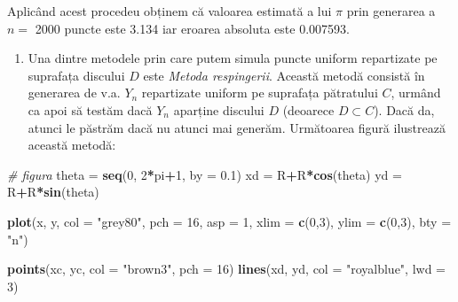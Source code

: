\documentclass[]{article}
\newenvironment{Shaded}{\begin{snugshade}}{\end{snugshade}}
\newcommand{\KeywordTok}[1]{\textcolor[rgb]{0.13,0.29,0.53}{\textbf{#1}}}
\newcommand{\DataTypeTok}[1]{\textcolor[rgb]{0.13,0.29,0.53}{#1}}
\newcommand{\DecValTok}[1]{\textcolor[rgb]{0.00,0.00,0.81}{#1}}
\newcommand{\FloatTok}[1]{\textcolor[rgb]{0.00,0.00,0.81}{#1}}
\newcommand{\StringTok}[1]{\textcolor[rgb]{0.31,0.60,0.02}{#1}}
\newcommand{\CommentTok}[1]{\textcolor[rgb]{0.56,0.35,0.01}{\textit{#1}}}
\newcommand{\OperatorTok}[1]{\textcolor[rgb]{0.81,0.36,0.00}{\textbf{#1}}}
\newcommand{\NormalTok}[1]{#1}
\providecommand{\tightlist}{%
  \setlength{\itemsep}{0pt}\setlength{\parskip}{0pt}}
\begin{document}
Aplicând acest procedeu obținem că valoarea estimată a lui \(\pi\) prin
generarea a \(n=\) 2000 puncte este 3.134 iar eroarea absoluta este
0.007593.

\begin{enumerate}
\def\labelenumi{\arabic{enumi}.}
\setcounter{enumi}{1}
\tightlist
\item
  Una dintre metodele prin care putem simula puncte uniform repartizate
  pe suprafața discului \(D\) este \emph{Metoda respingerii}. Această
  metodă consistă în generarea de v.a. \(Y_n\) repartizate uniform pe
  suprafața pătratului \(C\), urmând ca apoi să testăm dacă \(Y_n\)
  aparține discului \(D\) (deoarece \(D\subset C\)). Dacă da, atunci le
  păstrăm dacă nu atunci mai generăm. Următoarea figură ilustrează
  această metodă:
\end{enumerate}

\begin{Shaded}
\begin{Highlighting}[]
\CommentTok{# figura }
\NormalTok{theta =}\StringTok{ }\KeywordTok{seq}\NormalTok{(}\DecValTok{0}\NormalTok{, }\DecValTok{2}\OperatorTok{*}\NormalTok{pi}\OperatorTok{+}\DecValTok{1}\NormalTok{, }\DataTypeTok{by =} \FloatTok{0.1}\NormalTok{)}
\NormalTok{xd =}\StringTok{ }\NormalTok{R}\OperatorTok{+}\NormalTok{R}\OperatorTok{*}\KeywordTok{cos}\NormalTok{(theta)}
\NormalTok{yd =}\StringTok{ }\NormalTok{R}\OperatorTok{+}\NormalTok{R}\OperatorTok{*}\KeywordTok{sin}\NormalTok{(theta)}

\KeywordTok{plot}\NormalTok{(x, y, }
     \DataTypeTok{col =} \StringTok{"grey80"}\NormalTok{, }\DataTypeTok{pch =} \DecValTok{16}\NormalTok{,}
     \DataTypeTok{asp =} \DecValTok{1}\NormalTok{, }
     \DataTypeTok{xlim =} \KeywordTok{c}\NormalTok{(}\DecValTok{0}\NormalTok{,}\DecValTok{3}\NormalTok{), }\DataTypeTok{ylim =} \KeywordTok{c}\NormalTok{(}\DecValTok{0}\NormalTok{,}\DecValTok{3}\NormalTok{),}
     \DataTypeTok{bty =} \StringTok{"n"}\NormalTok{)}

\KeywordTok{points}\NormalTok{(xc, yc, }\DataTypeTok{col =} \StringTok{"brown3"}\NormalTok{, }\DataTypeTok{pch =} \DecValTok{16}\NormalTok{)}
\KeywordTok{lines}\NormalTok{(xd, yd, }\DataTypeTok{col =} \StringTok{"royalblue"}\NormalTok{, }\DataTypeTok{lwd =} \DecValTok{3}\NormalTok{)}
\end{Highlighting}
\end{Shaded}
\end{document}
